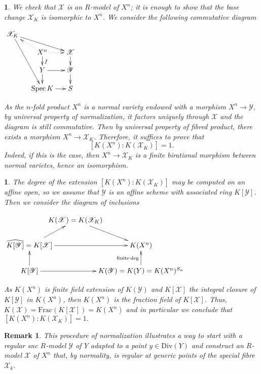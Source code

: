\documentclass{amsart}%
\numberwithin{equation}{subsection}
\theoremstyle{plain2}
\theoremstyle{definition2}
\newtheorem{rem}[equation]{Remark}
\theoremstyle{stepstyle}
\theoremstyle{point}
\theoremstyle{subpoint}
\newtheorem{subpoint}[equation]{}%
\newcommand{\spa}[1]{\begin{subpoint}#1\end{subpoint}}           %
\newcommand{\cX}{\ensuremath{\mathscr{X}}}
\newcommand{\cY}{\ensuremath{\mathscr{Y}}}
\renewcommand{\cY}{\ensuremath{\mathscr{Y}}}
\newcommand{\Spec}{\ensuremath{\mathrm{Spec}\,}}
\begin{document}
\spa{We check that $\cX$ is an $R$-model of $X^n$; it is enough to show that the base change $\cX_K$ is isomorphic to $X^n$. We consider the following commutative diagram
\begin{center}$
\begin{gathered}
\xymatrixrowsep{1pc}
\xymatrixcolsep{1pc}\xymatrix{ 
\cX_K \ar[drr] \ar[dddr] & & \\
& X^n \ar@{.>}[r] \ar@{.>}[ul]\ar[d]^{f} & \cX \ar[d] \\
& Y \ar[r] \ar[d] & \cY  \ar[d]\\
& \Spec K \ar[r] & S \\
}
\end{gathered}$
\end{center} As the $n$-fold product $X^n$ is a normal variety endowed with a morphism $X^n \rightarrow \cY$, by universal property of normalization, it factors uniquely through $\cX$ and the diagram is still commutative. Then by universal property of fibred product, there exists a morphism $X^n \rightarrow \cX_K$. Therefore, it suffices to prove that $$[K(X^n):K(\cX_K)]=1.$$ Indeed, if this is the case, then $X^n \rightarrow \cX_K$ is a finite birational morphism between normal varietes, hence an isomorphism.}

\spa{The degree of the extension $[K(X^n):K(\cX_K)]$ may be computed on an affine open, so we assume that $\cY$ is an affine scheme with associated ring $K[\cY]$. Then we consider the diagram of inclusions
\begin{center} 
$ \xymatrixcolsep{-1pc} \xymatrixrowsep{1.5pc}\xymatrix{ 
& K(\cX)=K(\cX_K) \ar[dr] & \\
\widehat{K[\cY]}=K[\cX] \ar[rr] \ar[ru] & & K(X^n)\\
K[\cY] \ar[u] \ar[rr]& & K(\cY)=K(Y)=K(X^n)^{S_n} \ar[u]^{\text{finite} \deg} \\
}$
\end{center} As $K(X^n)$ is finite field extension of $K(\cY)$ and $K[\cX]$ the integral closure of $K[\cY]$ in $K(X^n)$, then $K(X^n)$ is the fraction field of $K[\cX]$. Thus, $K(\cX) = \text{Frac}(K[\cX])=K(X^n)$ and in particular we conclude that $[K(X^n):K(\cX_K)]=1.$
}

\begin{rem} \label{rem divi repre quotient}
This procedure of normalization illustrates a way to start with a regular snc $R$-model $\cY$ of $Y$ adapted to a point $y \in \text{Div}(Y)$ and construct an $R$-model $\cX$ of $X^n$ that, by normality, is regular at generic points of the special fibre $\cX_k$. 
\end{rem}
\end{document}
